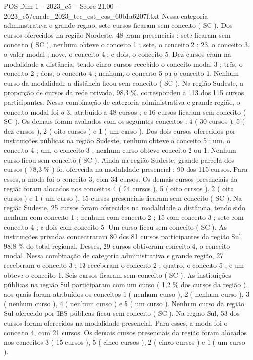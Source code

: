 \begin{textsample}{POS Dim 1 – 2023\_c5 – Score 21.00 – 2023\_c5/enade\_2023\_tec\_est\_cos\_60b1a6207f.txt}
Nessa categoria administrativa e grande região, sete cursos ficaram sem conceito ( SC ).
Dos cursos oferecidos na região Nordeste, 48 eram presenciais : sete ficaram sem conceito ( SC ), nenhum obteve o conceito 1 ; sete, o conceito 2 ; 23, o conceito 3, o valor modal ; nove, o conceito 4 ; e dois, o conceito 5.
Dez cursos eram na modalidade a distância, tendo cinco cursos recebido o conceito modal 3 ; três, o conceito 2 ; dois, o conceito 4 ; nenhum, o conceito 5 ou o conceito 1.
Nenhum curso da modalidade a distância ficou sem conceito ( SC ).
Na região Sudeste, a proporção de cursos da rede privada, 98,3 \%, correspondeu a 113 dos 115 cursos participantes.
Nessa combinação de categoria administrativa e grande região, o conceito modal foi o 3, atribuído a 48 cursos ; e 16 cursos ficaram sem conceito ( SC ).
Os demais foram avaliados com os seguintes conceitos : 4 ( 30 cursos ), 5 ( dez cursos ), 2 ( oito cursos ) e 1 ( um curso ).
Dos dois cursos oferecidos por instituições públicas na região Sudeste, nenhum obteve o conceito 5 ; um, o conceito 4 ; um, o conceito 3 ; nenhum curso obteve conceito 2 ou 1.
Nenhum curso ficou sem conceito ( SC ).
Ainda na região Sudeste, grande parcela dos cursos ( 78,3 \% ) foi oferecida na modalidade presencial : 90 dos 115 cursos.
Para esses, a moda foi o conceito 3, com 34 cursos.
Os demais cursos presenciais da região foram alocados nos conceitos 4 ( 24 cursos ), 5 ( oito cursos ), 2 ( oito cursos ) e 1 ( um curso ). 15 cursos presenciais ficaram sem conceito ( SC ).
Na região Sudeste, 25 cursos foram oferecidos na modalidade a distância, tendo sido nenhum com conceito 1 ; nenhum com conceito 2 ; 15 com conceito 3 ; sete com conceito 4 ; e dois com conceito 5.
Um curso ficou sem conceito ( SC ).
As instituições privadas concentraram 80 dos 81 cursos participantes da região Sul, 98,8 \% do total regional.
Desses, 29 cursos obtiveram conceito 4, o conceito modal.
Nessa combinação de categoria administrativa e grande região, 27 receberam o conceito 3 ; 13 receberam o conceito 2 ; quatro, o conceito 5 ; e um obteve o conceito 1.
Seis cursos ficaram sem conceito ( SC ).
As instituições públicas na região Sul participaram com um curso ( 1,2 \% dos cursos da região ), aos quais foram atribuídos os conceitos 1 ( nenhum curso ), 2 ( nenhum curso ), 3 ( nenhum curso ), 4 ( nenhum curso ) e 5 ( um curso ).
Nenhum curso da região Sul oferecido por IES públicas ficou sem conceito ( SC ).
Na região Sul, 53 dos cursos foram oferecidos na modalidade presencial.
Para esses, a moda foi o conceito 4, com 21 cursos.
Os demais cursos presenciais da região foram alocados nos conceitos 3 ( 15 cursos ), 5 ( cinco cursos ), 2 ( cinco cursos ) e 1 ( um curso ).

\end{textsample}
